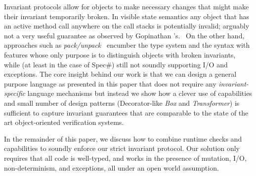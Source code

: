 Invariant protocols allow for objects to make necessary changes that might make their invariant temporarily broken.
In visible state semantics any object that has an active method call anywhere on the call stacks is potentially invalid; arguably not a very useful guarantee as observed by
Gopinathan \etal's.~\cite{Gopinathan:2008:RMO:1483018.1483028}
On the other hand, approaches such as \textit{pack/unpack}~\cite{DBLP:journals/jot/BarnettDFLS04} encumber the type system and the syntax with features whose only purpose is to distinguish objects with broken invariants, while (at least in the case of Spec\#) still not soundly supporting I/O and exceptions.
The core insight behind our work is that we can design a general purpose language as presented in this paper that does not require any \emph{invariant-specific} language mechanisms but instead we show how a clever use of capabilities and small number of design patterns (Decorator-like \textit{Box} and \textit{Transformer}) is sufficient to capture invariant guarantees that are comparable to the state of the art object-oriented verification systems.


In the remainder of this paper, we discuss how to combine runtime checks and capabilities
to soundly enforce our strict invariant protocol.
Our solution only requires 
that all code is well-typed, and works in the presence of mutation, I/O, non-determinism, and exceptions, all under an open world assumption.

